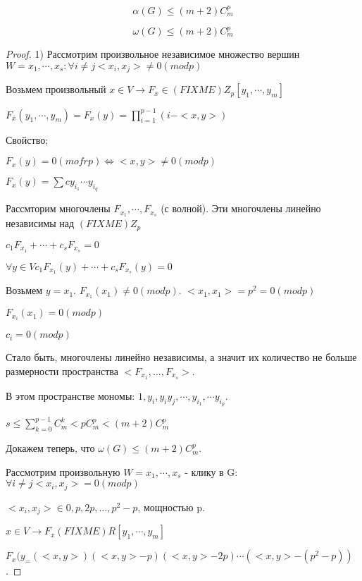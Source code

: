 \begin{lemma}
    $$\alpha(G) \le (m+2)C_m^p$$

    $$\omega(G) \le (m+2)C_m^p$$
    
\begin{proof}

    1) Рассмотрим произвольное независимое множество вершин $W = {x_1, \cdots, x_s} : \forall i \ne j <x_i, x_j> \ne 0 (mod p) $ 

    Возьмем произвольный $x \in V \rightarrow F_x \in (FIXME) Z_p [ y_1, \cdots, y_m ]$

    $F_{\bar x}(y_1,\cdots,y_m) = F_x(y) = \prod_{i=1}^{p-1}(i - <x,y>)$

    Свойство;

    $F_x(y) = 0(mofr p) \Leftrightarrow <x,y> \ne 0 (mod p)$
    
    $F_x(y) = \sum c y_{i_1} \cdots y_{i_q}$


    Рассмторим многочлены $F_{x_1}, \cdots, F_{x_s}$ (с волной). Эти многочлены линейно независимы над $(FIXME) Z_p$

    $c_1F_{x_1} + \cdots + c_sF_{x_s} = 0$

    $\forall y \in V c_1F_{x_1}(y) + \cdots + c_sF_{x_s}(y) = 0$

    Возьмем $y = x_1$. $F_{x_1}(x_1) \ne 0 (mod p)$. $<x_1, x_1> = p^2 = 0 (mod p)$

    $F_{x_i}(x_1) = 0(mod p)$

    $c_i = 0(mod p)$

    Стало быть, многочлены линейно независимы, а значит их количество не больше размерности пространства $<F_{x_1},\ldots,F_{x_s}>$.

    В этом пространстве мономы: $1, y_i, y_iy_j, \cdots, y_{i_1},\cdots y_{i_p}$.


    $s \le \sum_{k = 0}^{p - 1} C_m^k < pC_m^p < (m + 2)C_m^p$
 

    Докажем теперь, что $\omega(G) \le (m + 2)C_m^p$.

    Рассмотрим произвольную $W = {x_1, \cdots, x_s}$ - клику в G: $\forall i \ne j <x_i, x_j> = 0 (mod p)$

    $ < x_i, x_j> \in {0, p, 2p, \ldots, p^2 - p}$, мощностью p.

    $x \in V \rightarrow F_x (FIXME) R[y_1,\cdots,y_m]$

    $F_x(y_ = (<x,y>)(<x,y> - p)(<x,y> - 2p)\cdots(<x,y>-(p^2-p))$.
    
\end{proof}
\end{lemma}

